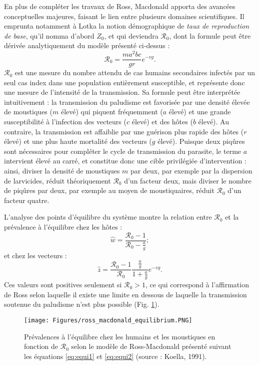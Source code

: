 En plus de compléter les travaux de Ross, Macdonald apporta des avancées  conceptuelles majeures, faisant le lien entre plusieurs domaines scientifiques.
Il emprunta notamment à Lotka la notion démographique de {\em taux de reproduction de base}, qu'il nomma d'abord $Z_0$, et qui deviendra $\mathcal{R}_0$, dont la formule peut être dérivée analytiquement du modèle présenté ci-dessus :
\begin{equation}
\mathcal{R}_0 = \frac{ma^2bc}{gr}e^{-vg}.
\end{equation}
$\mathcal{R}_0$ est une mesure du nombre attendu de cas humains secondaires infectés par un seul cas index dans une population entièrement susceptible, et représente donc une mesure de l'intensité de la transmission.
Sa formule peut être interprétée intuitivement : la transmission du paludisme est favorisée par une densité élevée de moustiques ($m$ élevé) qui piquent fréquemment ($a$ élevé) et une grande susceptibilité à l'infection des vecteurs ($c$ élevé) et des hôtes ($b$ élevé).
Au contraire, la transmission est affaiblie par une guérison plus rapide des hôtes ($r$ élevé) et une plus haute mortalité des vecteurs ($g$ élevé).
Puisque deux piqûres sont nécessaires pour compléter le cycle de transmission du parasite, le terme $a$ intervient élevé au carré, et constitue donc une cible privilégiée d'intervention : ainsi, diviser la densité de moustiques $m$ par deux, par exemple par la dispersion de larvicides, réduit théoriquement $\mathcal{R}_0$ d'un facteur deux, mais diviser le nombre de piqûres par deux, par exemple au moyen de moustiquaires, réduit $\mathcal{R}_0$ d'un facteur quatre.

L'analyse des points d'équilibre du système montre la relation entre $\mathcal{R}_0$ et la prévalence à l'équilibre chez les hôtes :
\begin{equation}
\label{eq:equi1}
\hat{w} = \frac{\mathcal{R}_0-1}{\mathcal{R}_0-\frac{a}{g}};
\end{equation}
et chez les vecteurs :
\begin{equation}
\label{eq:equi2}
\hat{z} = \frac{\mathcal{R}_0-1}{\mathcal{R}_0}\frac{\frac{a}{g}}{1+\frac{a}{g}}e^{-vg}.
\end{equation}
Ces valeurs sont positives seulement si $\mathcal{R}_0>1$, ce qui correspond à l'affirmation de Ross selon laquelle il existe une limite en dessous de laquelle la transmission soutenue du paludisme n'est plus possible (Fig. \ref{fig:equilibrium}).

\begin{figure}[t]
	\centering
	\texttt{[image: Figures/ross\_macdonald\_equilibrium.PNG]}
	\caption{Prévalences à l'équilibre chez les humains et les moustiques en fonction de $\mathcal{R}_0$ selon le modèle de Ross-Macdonald présenté suivant les équations \ref{eq:equi1} et \ref{eq:equi2} (source : Koella, 1991).}
	\label{fig:equilibrium}
\end{figure}


